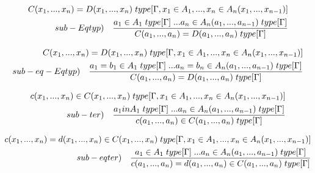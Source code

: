 \documentclass[10pt,a4paper, italian]{book}
\begin{document}
{{\begin{equation}
\begin{split}
C(x_1,...,x_n) = D(x_1,...,x_n) \hspace{0.1cm}type[\Gamma, x_1 \in A_1,...,x_n \in A_n(x_1,...,x_{n-1})] \\ sub-Eqtyp) \quad \frac{a_1 \in A_1\hspace{0.1cm}type[\Gamma]\hspace{0.1cm}...a_n \in A_n(a_1,...,a_{n-1})\hspace{0.1cm}type[\Gamma]}{ C(a_1,...,a_n) = D(a_1,...,a_n)\hspace{0.1cm}type[\Gamma]}
\end{split}
\end{equation}

\begin{equation}
\begin{split}
C(x_1,...,x_n) = D(x_1,...,x_n) \hspace{0.1cm}type[\Gamma, x_1 \in A_1,...,x_n \in A_n(x_1,...,x_{n-1})] \\ sub-eq-Eqtyp) \quad \frac{a_1 = b_1\in A_1\hspace{0.1cm}type[\Gamma]\hspace{0.1cm}...a_n = b_n \in A_n(a_1,...,a_{n-1})\hspace{0.1cm}type[\Gamma]}{ C(a_1,...,a_n) = D(a_1,...,a_n)\hspace{0.1cm}type[\Gamma]}
\end{split}
\end{equation}

\begin{equation}
\begin{split}
c(x_1,...,x_n) \in C(x_1,...,x_n) \hspace{0.1cm}type[\Gamma, x_1 \in A_1,...,x_n \in A_n(x_1,...,x_{n-1})] \\ sub-ter) \quad \frac{a_1 in A_1\hspace{0.1cm}type[\Gamma]\hspace{0.1cm}...a_n \in A_n(a_1,...,a_{n-1})\hspace{0.1cm}type[\Gamma]}{ c(a_1,...,a_n) \in C(a_1,...,a_n)\hspace{0.1cm}type[\Gamma]}
\end{split}
\end{equation}

\begin{equation}
\begin{split}
c(x_1,...,x_n) = d(x_1,...,x_n)  \in C(x_1,...,x_n) \hspace{0.1cm}type[\Gamma, x_1 \in A_1,...,x_n \in A_n(x_1,...,x_{n-1})] \\ sub-eqter) \quad \frac{a_1 \in A_1\hspace{0.1cm}type[\Gamma]\hspace{0.1cm}...a_n \in A_n(a_1,...,a_{n-1})\hspace{0.1cm}type[\Gamma]}{ c(a_1,...,a_n) = d(a_1,...,a_n) \in C(a_1,...,a_n)\hspace{0.1cm}type[\Gamma]}
\end{split}
\end{equation}

}}
\end{document}
